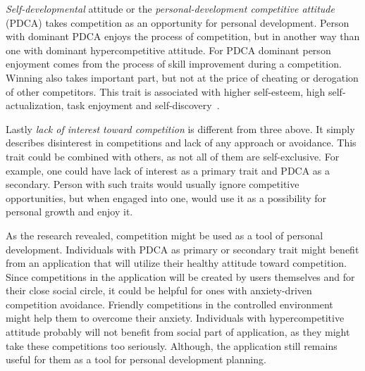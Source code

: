 \textit{Self-developmental} attitude or the \textit{personal-development competitive attitude} (PDCA)
takes competition as an opportunity for personal development.
Person with dominant PDCA enjoys the process of competition, but in another way than one with dominant hypercompetitive
attitude.
For PDCA dominant person enjoyment comes from the process of skill improvement during a competition.
Winning also takes important part, but not at the price of cheating or derogation of other competitors.
This trait is associated with higher self-esteem, high self-actualization, task enjoyment and self-discovery~\cite{cit-ryckman-pdca}.

Lastly \textit{lack of interest toward competition} is different from three above.
It simply describes disinterest in competitions and lack of any approach or avoidance.
This trait could be combined with others, as not all of them are self-exclusive.
For example, one could have lack of interest as a primary trait and PDCA as a secondary.
Person with such traits would usually ignore competitive opportunities, but when engaged into one,
would use it as a possibility for personal growth and enjoy it.~\cite{the-four-faces-of-competetition}

As the research revealed, competition might be used as a tool of personal development.
Individuals with PDCA as primary or secondary trait might benefit from an application that will utilize their healthy
attitude toward competition.
Since competitions in the application will be created by users themselves and for their close social circle,
it could be helpful for ones with anxiety-driven competition avoidance.
Friendly competitions in the controlled environment might help them to overcome their anxiety.
Individuals with hypercompetitive attitude probably will not benefit from social part of application,
as they might take these competitions too seriously.
Although, the application still remains useful for them as a tool for personal development planning.